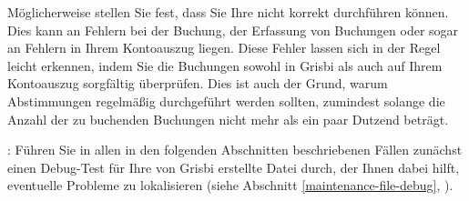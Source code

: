 Möglicherweise stellen Sie fest, dass Sie Ihre  nicht korrekt durchführen können. Dies kann an Fehlern bei der Buchung, der Erfassung von Buchungen oder sogar an Fehlern in Ihrem Kontoauszug liegen. Diese Fehler lassen sich in der Regel leicht erkennen, indem Sie die Buchungen sowohl in Grisbi als auch auf Ihrem Kontoauszug sorgfältig überprüfen. Dies ist auch der Grund, warum Abstimmungen regelmäßig durchgeführt werden sollten, zumindest solange die Anzahl der zu buchenden Buchungen nicht mehr als ein paar Dutzend beträgt.

\Note{}: Führen Sie in allen in den folgenden Abschnitten beschriebenen Fällen zunächst einen Debug-Test für Ihre von Grisbi erstellte Datei durch, der Ihnen dabei hilft, eventuelle Probleme zu lokalisieren (siehe Abschnitt \vref{maintenance-file-debug}, ).


